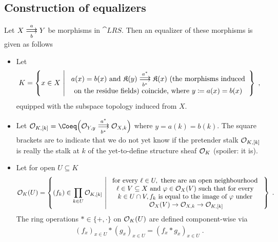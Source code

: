 \documentclass[a4paper,parskip=half,numbers=enddot, DIV=12]{scrreprt}
\begin{document}
\subsection{Construction of equalizers}
\begin{prop}
    Let $X\doublemorphism[a][\smash{b}] Y$ be morphisms in $\cat{LRS}$. Then an equalizer of these morphisms is given as follows
    \begin{itemize}
      \item 
        Let 
        \begin{align*}
        	K = \left\{ x\in X\st 
        	\begin{array}{c}
	        	a(x) = b(x) \text{ and }\KK(y) \doublemorphism[a^*][b^*] \KK(x)\text{ (the morphisms induced}\\
	        	\text{on the residue fields) coincide, where }y\coloneqq a(x)=b(x)
        	\end{array}\right\}\;,
        \end{align*}
        equipped with the subspace topology induced from $X$.
      \item 
        Let $\Oo_{K,[k]} = \Coeq\Big(\Oo_{Y,y} \doublemorphism[a^*][b^*] \Oo_{X,k}\Big)$ where $y=a(k) = b(k)$. The square brackets are to indicate that we do not yet know if the pretender stalk $\mathcal{O}_{K,[k]}$ is really the stalk at $k$ of the yet-to-define structure sheaf $\mathcal{O}_K$ (spoiler: it is).
      \item 
        Let for open $U\subseteq K$ 
        \begin{align*}
            \Oo_K(U) = \left\{(f_k)\in \prod_{k\in U} \Oo_{K,[k]} \st \begin{array}{c}
                \text{for every } \ell\in U, \text{ there are an open neighbourhood } \\
                \ell\in V \subseteq X \text{ and } \phi\in\Oo_X(V) \text{ such that for every } \\
                k\in U\cap V, f_k \text{ is equal to the image of }\phi\text{ under }\\
                \Oo_X(V) \morphism \Oo_{X,k} \morphism\Oo_{K,[k]}
            \end{array}
            \right\}\;.
        \end{align*}
        The ring operations $*\in\{+,\cdot\}$ on $\mathcal{O}_K(U)$ are defined component-wise via  
        \begin{align*}
            (f_x)_{x\in U} * (g_x)_{x\in U} = (f_x* g_x)_{x\in U}\;.
        \end{align*}        

\end{itemize}
\end{prop}
\end{document}
